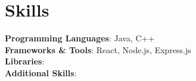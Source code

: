 \section{Skills}
    \begin{itemize}[leftmargin=0.15in, label={}]
	\small{\item{
		\textbf{Programming Languages}{: Java, C++} \\
        \textbf{Frameworks \& Tools}{: React, Node.js, Express.js} \\
		\textbf{Libraries}{: } \\
        \textbf{Additional Skills}{: } \\
	}}
    \end{itemize}